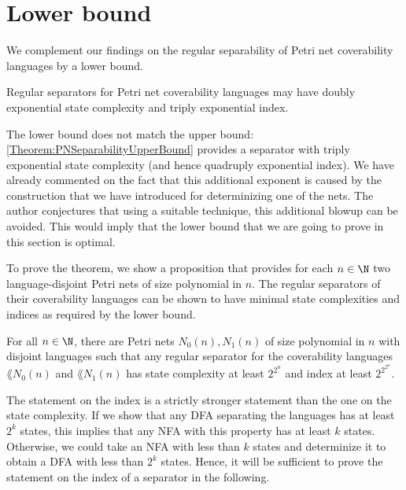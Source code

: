 \documentclass[../../diss.tex]{subfiles}
\begin{document}
\section{Lower bound}%
\label{Section:PNSeparabilityLowerBound}%

We complement our findings on the regular separability of Petri net coverability languages by a lower bound.

\begin{theorem}%
\label{Theorem:PNSeparabilityLowerBound}%
    Regular separators for Petri net coverability languages may have doubly exponential state complexity and triply exponential index.
\end{theorem}

The lower bound does not match the upper bound: \cref{Theorem:PNSeparabilityUpperBound} provides a separator with triply exponential state complexity (and hence quadruply exponential index).
We have already commented on the fact that this additional exponent is caused by the construction that we have introduced for determinizing one of the nets.
The author conjectures that using a suitable technique, this additional blowup can be avoided.
This would imply that the lower bound that we are going to prove in this section is optimal.

To prove the theorem, we show a proposition that provides for each $n \in \N$ two language-disjoint Petri nets of size polynomial in $n$.
The regular separators of their coverability languages can be shown to have minimal state complexities and indices as required by the lower bound.

\begin{proposition}%
\label{Proposition:PNSeparabilityLowerBound}%
    For all $n \in \N$, there are Petri nets $N_0(n), N_1(n)$ of size polynomial in $n$ with disjoint languages such that any regular separator for the coverability languages $\lang{N_0(n)}$ and $\lang{N_1(n)}$ has state complexity at least $2^{2^n}$ and index at least $2^{2^{2^n}}$.
\end{proposition}

The statement on the index is a strictly stronger statement than the one on the state complexity.
If we show that any DFA separating the languages has at least $2^k$ states, this implies that any NFA with this property has at least $k$ states.
Otherwise, we could take an NFA with less than $k$ states and determinize it to obtain a DFA with less than $2^k$ states.
Hence, it will be sufficient to prove the statement on the index of a separator in the following.
\end{document}
